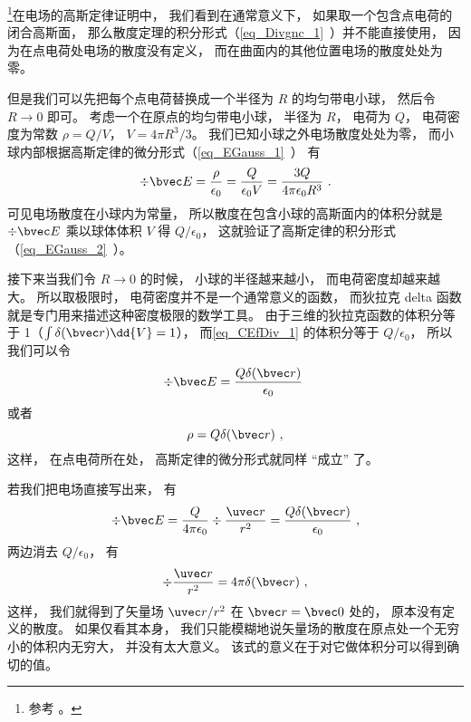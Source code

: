 

\footnote{参考 \cite{GriffE}。}在电场的高斯定律证明中， 我们看到在通常意义下， 如果取一个包含点电荷的闭合高斯面， 那么散度定理的积分形式（\autoref{eq_Divgnc_1}~）并不能直接使用， 因为在点电荷处电场的散度没有定义， 而在曲面内的其他位置电场的散度处处为零。

但是我们可以先把每个点电荷替换成一个半径为 $R$ 的均匀带电小球， 然后令 $R\to 0$ 即可。 考虑一个在原点的均匀带电小球， 半径为 $R$， 电荷为 $Q$， 电荷密度为常数 $\rho = Q/V$， $V = 4\pi R^3/3$。 我们已知小球之外电场散度处处为零， 而小球内部根据高斯定律的微分形式（\autoref{eq_EGauss_1}~） 有
\begin{equation}\label{eq_CEfDiv_1}
\div \bvec E = \frac{\rho}{\epsilon_0} = \frac{Q}{\epsilon_0 V} = \frac{3Q}{4\pi \epsilon_0 R^3}~.
\end{equation}
可见电场散度在小球内为常量， 所以散度在包含小球的高斯面内的体积分就是 $\div \bvec E$ 乘以球体体积 $V$ 得 $Q/\epsilon_0$， 这就验证了高斯定律的积分形式（\autoref{eq_EGauss_2}~）。

接下来当我们令 $R\to 0$ 的时候， 小球的半径越来越小， 而电荷密度却越来越大。 所以取极限时， 电荷密度并不是一个通常意义的函数， 而狄拉克 delta 函数就是专门用来描述这种密度极限的数学工具。 由于三维的狄拉克函数的体积分等于 1（$\int \delta(\bvec r)\dd{V} = 1$）， 而\autoref{eq_CEfDiv_1} 的体积分等于 $Q/\epsilon_0$， 所以我们可以令
\begin{equation}
\div \bvec E = \frac{Q\delta(\bvec r)}{\epsilon_0}~
\end{equation}
或者
\begin{equation}
\rho = Q\delta(\bvec r)~,
\end{equation}
这样， 在点电荷所在处， 高斯定律的微分形式就同样 “成立” 了。

若我们把电场直接写出来， 有
\begin{equation}
\div \bvec E = \frac{Q}{4\pi\epsilon_0}\div \frac{\uvec r}{r^2} = \frac{Q\delta(\bvec r)}{\epsilon_0}~,
\end{equation}
两边消去 $Q/\epsilon_0$， 有
\begin{equation}\label{eq_CEfDiv_2}
\div \frac{\uvec r}{r^2} = 4\pi\delta(\bvec r)~,
\end{equation}
这样， 我们就得到了矢量场 ${\uvec r}/{r^2}$ 在 $\bvec r = \bvec 0$ 处的， 原本没有定义的散度。 如果仅看其本身， 我们只能模糊地说矢量场的散度在原点处一个无穷小的体积内无穷大， 并没有太大意义。 该式的意义在于对它做体积分可以得到确切的值。
